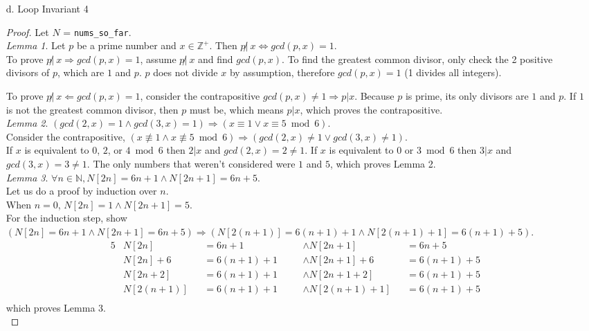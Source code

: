 \documentclass[fontsize=11pt]{article}
\newcommand{\N}{\mathbb{N}}
\newcommand{\Z}{\mathbb{Z}}
\begin{document}
\begin{enumerate}
\begin{enumerate}
\item[d.] Loop Invariant 4
\begin{proof}
\textit{\newline } Let $N$ = \texttt{nums\_so\_far}.\\
\textit{\newline Lemma 1}. Let $p$ be a prime number and $x \in \Z^+$. Then $p \not|\ x \Leftrightarrow gcd(p, x) = 1$.\\
To prove $p \not|\ x \Rightarrow gcd(p, x) = 1$, assume $p \not|\ x$ and find $gcd(p, x)$. To find the greatest common divisor, only check the 2 positive divisors of $p$, which are $1$ and $p$. $p$ does not divide $x$ by assumption, therefore $gcd(p, x) = 1$ (1 divides all integers).

To prove $p \not|\ x \Leftarrow gcd(p, x) = 1$, consider the contrapositive $gcd(p, x) \neq 1 \Rightarrow p | x$. Because $p$ is prime, its only divisors are $1$ and $p$. If $1$ is not the greatest common divisor, then $p$ must be, which means $p | x$, which proves the contrapositive.\\

\textit{Lemma 2}. $(gcd(2, x) = 1 \land gcd(3, x) = 1) \Rightarrow (x \equiv 1 \lor x \equiv 5 \bmod 6)$.\\
Consider the contrapositive, $(x \not\equiv 1 \land x \not\equiv 5 \bmod 6) \Rightarrow (gcd(2, x) \neq 1 \lor gcd(3, x) \neq 1)$.\\
If $x$ is equivalent to $0$, $2$, or $4 \bmod 6$ then $2 | x$ and $gcd(2, x) = 2 \neq 1$. If $x$ is equivalent to $0$ or $3 \bmod 6$ then $3 | x$ and $gcd(3, x) = 3 \neq 1$. The only numbers that weren't considered were $1$ and $5$, which proves Lemma 2.\\

\textit{Lemma 3}. $\forall n \in \N, N[2n] = 6n + 1 \land N[2n + 1] = 6n + 5$.\\
Let us do a proof by induction over $n$.\\
When $n = 0$, $N[2n] = 1 \land N[2n + 1] = 5$.\\
For the induction step, show\\
$(N[2n] = 6n + 1 \land N[2n + 1] = 6n + 5) \Rightarrow (N[2(n + 1)] = 6(n + 1) + 1 \land N[2(n + 1) + 1] = 6(n + 1) + 5)$.\\
\begin{alignat*}{5}
    &N[2n]       &&= 6n + 1       \quad &&\land N[2n + 1]       &&= 6n + 5\\
    &N[2n] + 6   &&= 6(n + 1) + 1 \quad &&\land N[2n + 1] + 6   &&= 6(n + 1) + 5\\
    &N[2n + 2]   &&= 6(n + 1) + 1 \quad &&\land N[2n + 1 + 2]   &&= 6(n + 1) + 5\\
    &N[2(n + 1)] &&= 6(n + 1) + 1 \quad &&\land N[2(n + 1) + 1] &&= 6(n + 1) + 5\\
\end{alignat*}
which proves Lemma 3.\\


\end{proof}
\end{enumerate}
\end{enumerate}
\end{document}
